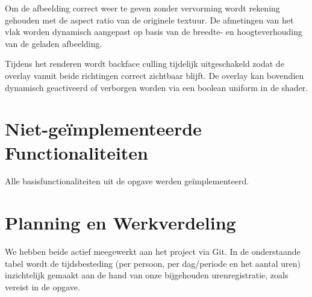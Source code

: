 \documentclass[11pt,a4paper]{article}
\begin{document}
Om de afbeelding correct weer te geven zonder vervorming wordt rekening gehouden met de aspect ratio van de originele textuur. De afmetingen van het vlak worden dynamisch aangepast op basis van de breedte- en hoogteverhouding van de geladen afbeelding.

Tijdens het renderen wordt backface culling tijdelijk uitgeschakeld zodat de overlay vanuit beide richtingen correct zichtbaar blijft. De overlay kan bovendien dynamisch geactiveerd of verborgen worden via een boolean uniform in de shader.

\section{Niet-geïmplementeerde Functionaliteiten}
Alle basisfunctionaliteiten uit de opgave werden geïmplementeerd.

\section{Planning en Werkverdeling}
We hebben beide actief meegewerkt aan het project via Git. In de onderstaande tabel wordt de tijdsbesteding (per persoon, per dag/periode en het aantal uren) inzichtelijk gemaakt aan de hand van onze bijgehouden urenregistratie, zoals vereist in de opgave.
\end{document}
